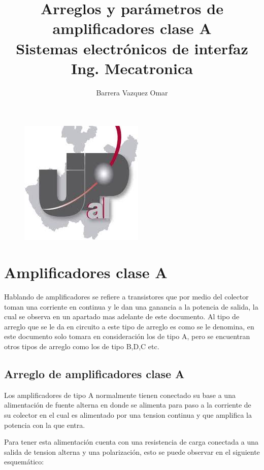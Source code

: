 \documentclass[11pt,a4paper]{article}
\author{Barrera Vazquez Omar}
\title{\textbf{Arreglos y parámetros de amplificadores clase A\\
Sistemas electrónicos de interfaz\\
Ing. Mecatronica}}
\begin{document}
\begin{figure}
\begin{center}
\includegraphics[scale=1]{1.jpeg} 
\end{center}
\end{figure}


\maketitle


\newpage

\section{Amplificadores clase A}

Hablando de amplificadores se refiere a transistores que por medio del colector toman una corriente en continua y le dan una ganancia a la potencia de salida, la cual se observa en un apartado mas adelante de este documento. Al tipo de arreglo que se le  da en circuito a este tipo de arreglo es como se le denomina, en este documento solo tomara en consideración los de tipo A, pero se encuentran otros tipos de arreglo como los de tipo B,D,C etc. 

\subsection{Arreglo de amplificadores clase A}

Los amplificadores de tipo A normalmente tienen conectado su base a una alimentación de fuente alterna en donde se alimenta para paso a la corriente de su colector en el cual es alimentado por una tension continua y que amplifica la potencia con la que entra.

Para tener esta alimentación cuenta con una resistencia de carga conectada a una salida de tension alterna y una polarización, esto se puede observar en el siguiente esquemático:
\end{document}
